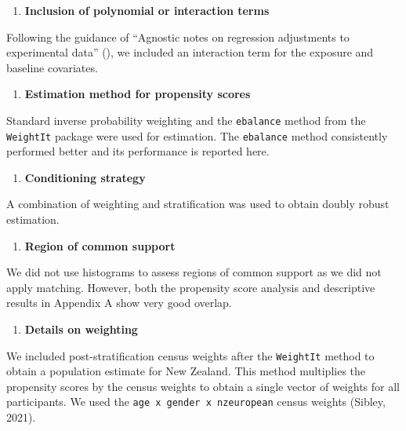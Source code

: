 \documentclass[
  singlecolumn,
  9pt]{article}
\providecommand{\tightlist}{%
  \setlength{\itemsep}{0pt}\setlength{\parskip}{0pt}}\usepackage{longtable,booktabs,array}
\begin{document}
\begin{enumerate}
\def\labelenumi{\arabic{enumi}.}
\setcounter{enumi}{3}
\tightlist
\item
  \textbf{Inclusion of polynomial or interaction terms}
\end{enumerate}

Following the guidance of {``Agnostic notes on regression adjustments to
experimental data''} (), we included an
interaction term for the exposure and baseline covariates.

\begin{enumerate}
\def\labelenumi{\arabic{enumi}.}
\setcounter{enumi}{4}
\tightlist
\item
  \textbf{Estimation method for propensity scores}
\end{enumerate}

Standard inverse probability weighting and the \texttt{ebalance} method
from the \texttt{WeightIt} package were used for estimation. The
\texttt{ebalance} method consistently performed better and its
performance is reported here.

\begin{enumerate}
\def\labelenumi{\arabic{enumi}.}
\setcounter{enumi}{4}
\tightlist
\item
  \textbf{Conditioning strategy}
\end{enumerate}

A combination of weighting and stratification was used to obtain doubly
robust estimation.

\begin{enumerate}
\def\labelenumi{\arabic{enumi}.}
\setcounter{enumi}{5}
\tightlist
\item
  \textbf{Region of common support}
\end{enumerate}

We did not use histograms to assess regions of common support as we did
not apply matching. However, both the propensity score analysis and
descriptive results in Appendix A show very good overlap.

\begin{enumerate}
\def\labelenumi{\arabic{enumi}.}
\setcounter{enumi}{6}
\tightlist
\item
  \textbf{Details on weighting}
\end{enumerate}

We included post-stratification census weights after the
\texttt{WeightIt} method to obtain a population estimate for New
Zealand. This method multiplies the propensity scores by the census
weights to obtain a single vector of weights for all participants. We
used the \texttt{age\ x\ gender\ x\ nzeuropean} census weights (Sibley,
2021).
\end{document}
